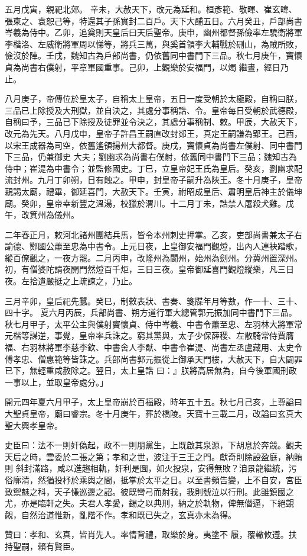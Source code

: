 \begin{pinyinscope}
 五月戊寅，親祀北郊。
 辛未，大赦天下，改元為延和。桓彥範、敬暉、崔玄暐、張柬之、袁恕己等，特還其子孫實封二百戶。天下大酺五日。六月癸丑，戶部尚書岑羲為侍中。乙卯，追奠則天皇后曰天后聖帝。庚申，幽州都督孫儉率左驍衛將軍李楷洛、左威衛將軍周以悌等，將兵三萬，與奚首領李大輔戰於硎山，為賊所敗，儉沒於陣。壬戌，魏知古為戶部尚書，仍依舊同中書門下三品。秋七月庚午，竇懷貞為尚書右僕射，平章軍國重事。己卯，上觀樂於安福門，以燭
 繼晝，經日乃止。



 八月庚子，帝傳位於皇太子，自稱太上皇帝，五日一度受朝於太極殿，自稱曰朕，三品已上除授及大刑獄，並自決之，其處分事稱誥、令。皇帝每日受朝於武德殿，自稱曰予，三品已下除授及徒罪並令決之，其處分事稱制、敕。甲辰，大赦天下，改元為先天。八月戊申，皇帝子許昌王嗣直改封郯王，真定王嗣謙為郢王。己酉，以宋王成器為司空，依舊遙領揚州大都督。庚戌，竇懷貞為尚書左僕射、同中書門下三品，仍兼御史
 大夫；劉幽求為尚書右僕射，依舊同中書門下三品；魏知古為侍中；崔湜為中書令；並監修國史。丁巳，立皇帝妃王氏為皇后。癸亥，劉幽求配流封州。九月丁卯朔，日有蝕之。甲申，封皇帝子嗣升為陜王。冬十月庚子，皇帝親謁太廟，禮畢，御延喜門，大赦天下。壬寅，祔昭成皇后、肅明皇后神主於儀坤廟。癸卯，皇帝幸新豐之溫湯，校獵於渭川。十二月丁未，誥禁人屠殺犬雞。戊午，改箕州為儀州。



 二年春正月，敕河北諸州團結兵馬，皆令本州刺史押掌。乙亥，吏部尚書兼太子右諭德、酂國公蕭至忠為中書令。上元日夜，上皇御安福門觀燈，出內人連袂踏歌，縱百僚觀之，一夜方罷。二月丙申，改隆州為閬州，始州為劍州。分冀州置深州。初，有僧婆陀請夜開門然燈百千炬，三日三夜。皇帝御延喜門觀燈縱樂，凡三日夜。左拾遺嚴挺之上疏諫之，乃止。



 三月辛卯，皇后祀先蠶。癸巳，制敕表狀、書奏、箋牒年月等數，作一十、三十、四十字。
 夏六月丙辰，兵部尚書、朔方道行軍大總管郭元振加同中書門下三品。秋七月甲子，太平公主與僕射竇懷貞、侍中岑羲、中書令蕭至忠、左羽林大將軍常元楷等謀逆，事覺，皇帝率兵誅之。窮其黨與，太子少保薛稷、左散騎常侍賈膺福、右羽林將軍李慈李欽、中書舍人李猷、中書令崔湜、尚書左丞盧藏用、太史令傅孝忠、僧惠範等皆誅之。兵部尚書郭元振從上御承天門樓，大赦天下，自大闢罪已下，無輕重咸赦除之。翌日，太上皇誥
 曰：』朕將高居無為，自今後軍國刑政一事以上，並取皇帝處分。」



 開元四年夏六月甲子，太上皇帝崩於百福殿，時年五十五。秋七月己亥，上尊謚曰大聖貞皇帝，廟曰睿宗。冬十月庚午，葬於橋陵。天寶十三載二月，改謚曰玄真大聖大興孝皇帝。



 史臣曰：法不一則奸偽起，政不一則朋黨生，上既啟其泉源，下胡息於奔競。觀夫天后之時，雲委於二張之第；孝和之世，波注于三王之門。獻奇則除設盈庭，納賄則
 斜封滿路，咸以進趨相軌，奸利是圖，如火投泉，安得無敗？洎景龍繼統，污俗廓清，然猶投杼於乘輿之間，抵掌於太平之日。以至書頻告變，上不自安，宮臣致禦魅之科，天子慊巡邊之詔。彼既彎弓而射我，我則號泣以行刑。此雖鎮國之尤，亦是臨軒之失。夫君人孝愛，錫之以典刑，納之於軌物，俾無僭逼，下絕覬覦，自然治道惟新，亂階不作。孝和既已失之，玄真亦未為得。



 贊曰：孝和、玄真，皆肖先人。率情背禮，取樂於身。夷塗不
 履，覆轍攸遵。扶持聖嗣，賴有賢臣。



\end{pinyinscope}
